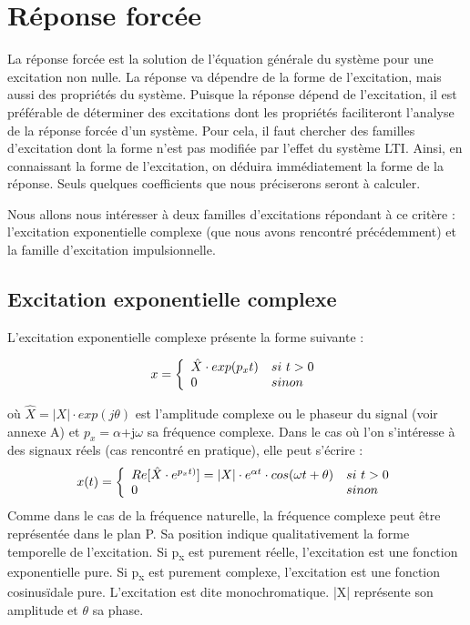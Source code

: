 \documentclass[]{book}
\begin{document}
{	
	\section{Réponse forcée}
	
	La réponse forcée est la solution de l'équation générale du système pour une excitation non nulle. La réponse va dépendre de la forme de l'excitation, mais aussi des
	propriétés du système. Puisque la réponse dépend de l'excitation, il est
	préférable de déterminer des excitations dont les propriétés
	faciliteront l'analyse de la réponse forcée d'un système. Pour cela, il
	faut chercher des familles d'excitation dont la forme n'est pas modifiée
	par l'effet du système LTI. Ainsi, en connaissant la forme de
	l'excitation, on déduira immédiatement la forme de la réponse. Seuls
	quelques coefficients que nous préciserons seront à calculer.
	
	Nous allons nous intéresser à deux familles d'excitations répondant à ce critère : l'excitation
	exponentielle complexe (que nous avons rencontré précédemment) et la
	famille d'excitation impulsionnelle.
	
	\subsection{Excitation exponentielle complexe}
	L'excitation exponentielle complexe présente la forme suivante :
	
	\begin{equation}\label{exc_expo_complexe}
		x =    \left \{
		\begin{array}{l l}
		\hat{X} \cdot exp(p_{x}t)  & si~t>0 \\
		0   & sinon \\
		\end{array}
		\right .
	\end{equation}
	
	où $ \hat{X} = |X| \cdot exp(j \theta)$ est l'amplitude complexe ou le phaseur du signal (voir annexe A) et $ p_{x} = \alpha $+j$ \omega $ sa fréquence complexe. Dans le cas où l'on s'intéresse à des signaux réels (cas rencontré en pratique), elle peut s'écrire :
	\begin{equation}\label{exc_expo_complexe_reel}
	x(t) =    \left \{
	\begin{array}{l l}
	Re[\hat{X} \cdot e^{p_{x}t)}] = |X| \cdot e^{\alpha t} \cdot cos(\omega t+\theta)  & si~t>0 \\
	0   & sinon \\
	\end{array}
	\right .
	\end{equation}
	Comme dans le cas de la fréquence naturelle, la fréquence complexe peut
	être représentée dans le plan P. Sa position indique qualitativement la
	forme temporelle de l'excitation. Si p\textsubscript{x} est purement
	réelle, l'excitation est une fonction exponentielle pure. Si
	p\textsubscript{x} est purement complexe, l'excitation est une fonction
	cosinusïdale pure. L'excitation est dite monochromatique. |X| représente son amplitude et $\theta$ sa phase.
	
}
\end{document}
